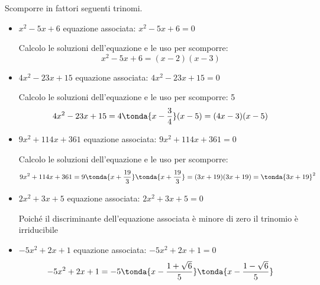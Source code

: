 \begin{esempio}
Scomporre in fattori seguenti trinomi.
\begin{itemize}
\item \(x^2 -5 x +6\) \quad equazione associata: \(x^2 -5x +6 = 0\)

Calcolo le soluzioni dell'equazione e le uso per scomporre: 
\[x^2 -5 x +6 = (x -2)(x -3)\]

\item \(4x^2 -23x +15\) \quad equazione associata: \(4x^2 -23x +15 = 0\)

Calcolo le soluzioni dell'equazione e le uso per scomporre: 
      {}{5}
\[4x^2 -23x +15 = 4\tonda{x -\dfrac{3}{4}} (x -5) = (4x -3)(x -5)\]

\item \(9x^2 +114x +361\) \quad equazione associata: \(9x^2 +114x +361 = 0\)

Calcolo le soluzioni dell'equazione e le uso per scomporre: 
      {}{}
\[9x^2 +114x +361 = 9 \tonda{x +\dfrac{19}{3}} \tonda{x +\dfrac{19}{3}} = 
(3x +19)(3x +19)= \tonda{3x+19}^2\]

\item \(2x^2 +3x +5\) \quad equazione associata: \(2x^2 +3x +5 = 0\)

            {}
Poiché il discriminante dell'equazione associata è minore di zero il trinomio 
è irriducibile

\item \(-5x^2 +2x +1\) \quad equazione associata: \(-5x^2 +2x +1 = 0\) 
      {}{}
\[-5x^2 +2x +1 = 
-5 \tonda{x -\dfrac{1 + \sqrt{6}}{5}} \tonda{x -\dfrac{1 - \sqrt{6}}{5}}\]

\end{itemize}
\end{esempio}
% 
% 
